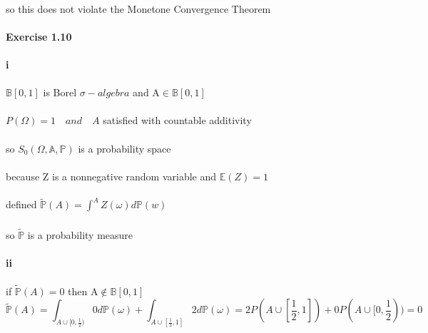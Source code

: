 \documentclass{article}
\begin{document}
{\paragraph{}{so this does not violate the Monetone Convergence Theorem}

\paragraph{Exercise 1.10 }
\paragraph{i}
\paragraph{}{$\mathbb{B}[0,1]$ is Borel $\sigma-algebra$ and A$\in\mathbb{B}[0,1]$ }
\paragraph{}{$P(\Omega)=1\quad and \quad A$ satisfied with countable additivity }
\paragraph{}{so $S_{0}(\Omega,\mathbb{A},\mathbb{P})$ is a probability space}
\paragraph{}{because Z is a nonnegative random variable and $\mathbb{E}(Z)=1$}
\paragraph{}{defined $\tilde{\mathbb{P}}(A)=\int_{}^{A}Z(\omega)d\mathbb{P}(w)$}
\paragraph{}{so $\tilde{\mathbb{P}}$ is a probability measure}
\paragraph{ii}{}
\paragraph{}{if $\tilde{\mathbb{P}}(A)=0$ then A$\notin \mathbb{B}[0,1]$}
\begin{displaymath}
  \tilde{\mathbb{P}}(A)=\int_{A\cup[0,\frac{1}{2})}^{}0d\mathbb{P}(\omega)+\int_{A\cup[\frac{1}{2},1]}^{}2d\mathbb{P}(\omega)
  =2P(A\cup[\frac{1}{2},1])+0P(A\cup[0,\frac{1}{2}))=0
\end{displaymath}
}
\end{document}
